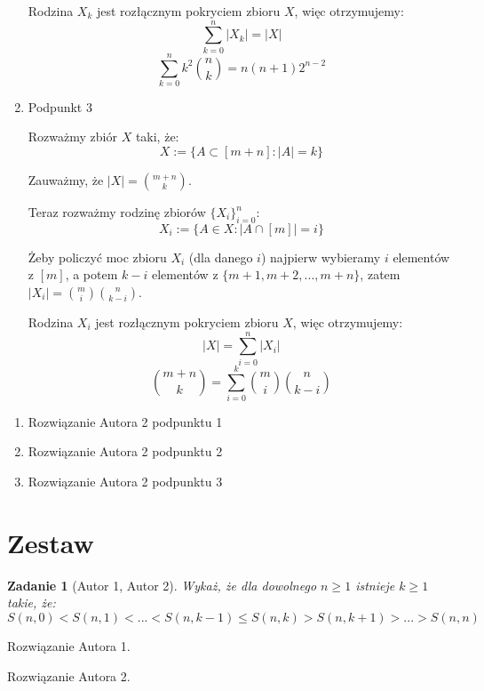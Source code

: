 \documentclass{mwart}
\newtheorem{zad}{Zadanie}[section]
\begin{document}
\begin{mdframed}
\begin{enumerate}
        Rodzina $X_k$ jest rozłącznym pokryciem zbioru $X$, więc otrzymujemy:
        \[\sum_{k=0}^{n} |X_k| = |X|\]
        \[\sum_{k=0}^{n}k^2{n \choose k}= n(n+1)2^{n-2}\]

        \item Podpunkt 3

        Rozważmy zbiór $X$ taki, że:
        \[X := \{A \subset [m + n] : |A| = k\}\]

        Zauważmy, że $|X| = {m+n \choose k}$.

        Teraz rozważmy rodzinę zbiorów $\{X_i\}_{i=0}^n$:
        \[X_i := \{A \in X : |A \cap [m]| = i\}\]
        
        Żeby policzyć moc zbioru $X_i$ (dla danego $i$) najpierw wybieramy $i$ elementów z $[m]$, a potem $k-i$ elementów z 
        $\{m+1, m+2, ..., m+n\}$, zatem $|X_i| = {m \choose i}{n \choose k-i}$.

        Rodzina $X_i$ jest rozłącznym pokryciem zbioru $X$, więc otrzymujemy:
        \[|X| = \sum_{i=0}^{n} |X_i|\]
        \[{m+n \choose k} = \sum_{i=0}^{k}{m \choose i}{n \choose k-i}\]

    \end{enumerate}
\end{mdframed}
\begin{mdframed}
    \begin{enumerate}
        \item Rozwiązanie Autora 2 podpunktu 1
        \item Rozwiązanie Autora 2 podpunktu 2
        \item Rozwiązanie Autora 2 podpunktu 3
    \end{enumerate}
\end{mdframed}






















\newpage
\section{Zestaw}          %

\begin{zad}[Autor 1, Autor 2]
    Wykaż, że dla dowolnego $n \geq 1$ istnieje $k \geq 1$ takie, że:
    \[S(n, 0) < S(n, 1) < ... < S(n, k - 1 ) \leq S(n, k) > S(n, k+1) > ... > S(n, n)\]
\end{zad}
\begin{mdframed}
    Rozwiązanie Autora 1.
\end{mdframed}
\begin{mdframed}
    Rozwiązanie Autora 2.
\end{mdframed}
\end{document}
